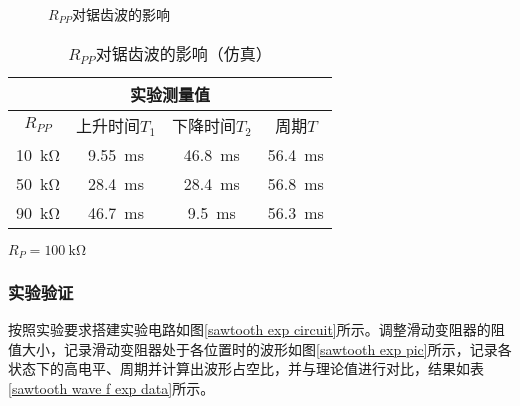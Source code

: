 \documentclass[UTF8]{ctexart}
\numberwithin{figure}{subsection}
\numberwithin{table}{subsection}
\numberwithin{equation}{subsection}
\begin{document}
\begin{figure}[H]
    \centering
    
    
    
    \caption{\(R_{PP}\)对锯齿波的影响}
    \label{sawtooth sim pic}
\end{figure}


\begin{table}[h]
    \begin{center}
        \caption{\(R_{PP}\)对锯齿波的影响（仿真）}
        \begin{tabular}{|c|c|c|c|}
            \hline
            \multicolumn{4}{|c|}{实验测量值} \\
            \hline
            \(R_{PP}\)  & 上升时间\(T_1\) & 下降时间\(T_2\) & 周期\(T\)\\
            \hline
            \SI{10}{\kilo\ohm} & \SI{9.55}{\milli\second} & \SI{46.8}{\milli\second} & \SI{56.4}{\milli\second} \\
            \hline
            \SI{50}{\kilo\ohm} & \SI{28.4}{\milli\second} & \SI{28.4}{\milli\second} & \SI{56.8}{\milli\second} \\
            \hline
            \SI{90}{\kilo\ohm} & \SI{46.7}{\milli\second} & \SI{9.5}{\milli\second} & \SI{56.3}{\milli\second} \\
            \hline
            
        \end{tabular}
        \par \(R_P = \SI{100}{\kilo\ohm}\)
    \end{center}
    \label{sawtooth wave f sim data}
\end{table}


\subsubsection{实验验证}
\par 按照实验要求搭建实验电路如图\ref{sawtooth exp circuit}所示。调整滑动变阻器的阻值大小，记录滑动变阻器处于各位置时的波形如图\ref{sawtooth exp pic}所示，记录各状态下的高电平、周期并计算出波形占空比，并与理论值进行对比，结果如表\ref{sawtooth wave f exp data}所示。
\end{document}

